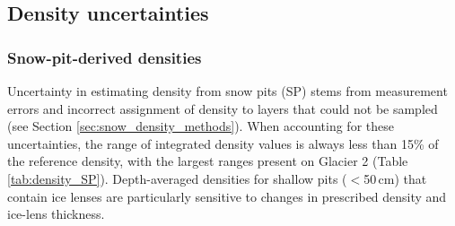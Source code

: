 \documentclass{sfuthesis}
\begin{document}
\subsection{Density uncertainties}

\subsubsection{Snow-pit-derived densities}

Uncertainty in estimating density from snow pits (SP) stems from measurement errors and incorrect assignment of density to layers that could not be sampled (see Section \ref{sec:snow_density_methods}). When accounting for these uncertainties, the range of integrated density values is always less than 15\% of the reference density, with the largest ranges present on Glacier 2 (Table \ref{tab:density_SP}). Depth-averaged densities for shallow pits ($<$50\,cm) that contain ice lenses are particularly sensitive to changes in prescribed density and ice-lens thickness.
\end{document}
